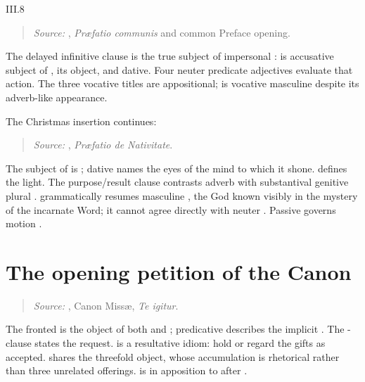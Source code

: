 \begin{courseunit}{III.8}
\begin{quote}
\emph{Source:} \Missal, \emph{Præfatio communis} and common Preface opening.
\end{quote}

The delayed infinitive clause is the true subject of impersonal :
 is accusative subject of ,  its object,
and  dative. Four neuter predicate adjectives evaluate that action.
The three vocative titles are appositional;  is vocative masculine
despite its adverb-like appearance.

The Christmas insertion continues:
\begin{quote}

\emph{Source:} \Missal, \emph{Præfatio de Nativitate}.
\end{quote}

The subject of  is ; dative
 names the eyes of the mind to which it shone.
 defines the light. The purpose/result clause contrasts
adverb  with substantival genitive plural
.  grammatically resumes masculine
, the God known visibly in the mystery of the incarnate Word; it
cannot agree directly with neuter . Passive 
governs motion .

\section{The opening petition of the Canon}

\begin{quote}

\emph{Source:} \Missal, Canon Missæ, \emph{Te igitur}.
\end{quote}

The fronted  is the object of both  and
; predicative  describes the implicit
. The -clause states the request. 
is a resultative idiom: hold or regard the gifts as accepted.
 shares the threefold object, whose accumulation is rhetorical
rather than three unrelated offerings.  is
in apposition to  after .


\end{courseunit}
